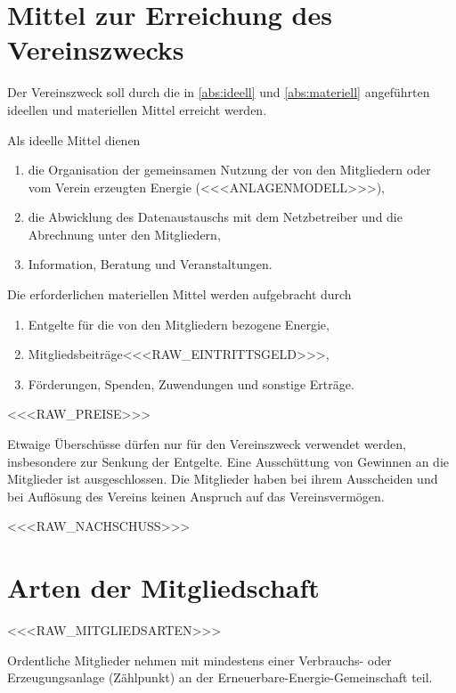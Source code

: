 \documentclass[a4paper,11pt]{article}
\begin{document}
\section{Mittel zur Erreichung des Vereinszwecks}\label{par:mittel}
\begin{absaetze}
  \item Der Vereinszweck soll durch die in \ref{abs:ideell} und \ref{abs:materiell} angeführten ideellen und
        materiellen Mittel erreicht werden.
  \item Als ideelle Mittel dienen\label{abs:ideell}
        \begin{enumerate}[label=\alph*)]
          \item die Organisation der gemeinsamen Nutzung der von den Mitgliedern oder vom Verein erzeugten Energie
                (<<<ANLAGENMODELL>>>),
          \item die Abwicklung des Datenaustauschs mit dem Netzbetreiber und die Abrechnung unter den Mitgliedern,
          \item Information, Beratung und Veranstaltungen.
        \end{enumerate}
  \item Die erforderlichen materiellen Mittel werden aufgebracht durch\label{abs:materiell}
        \begin{enumerate}[label=\alph*)]
          \item Entgelte für die von den Mitgliedern bezogene Energie,
          \item Mitgliedsbeiträge<<<RAW_EINTRITTSGELD>>>,
          \item Förderungen, Spenden, Zuwendungen und sonstige Erträge.
        \end{enumerate}
  \item <<<RAW_PREISE>>>
  \item Etwaige Überschüsse dürfen nur für den Vereinszweck verwendet werden, insbesondere zur Senkung der Entgelte.
        Eine Ausschüttung von Gewinnen an die Mitglieder ist ausgeschlossen. Die Mitglieder haben bei ihrem Ausscheiden
        und bei Auflösung des Vereins keinen Anspruch auf das Vereinsvermögen.
  \item <<<RAW_NACHSCHUSS>>>
\end{absaetze}

\section{Arten der Mitgliedschaft}\label{par:arten}
\begin{absaetze}
  \item <<<RAW_MITGLIEDSARTEN>>>
  \item Ordentliche Mitglieder nehmen mit mindestens einer Verbrauchs- oder Erzeugungsanlage (Zählpunkt) an der
        Erneuerbare-Energie-Gemeinschaft teil.
\end{absaetze}
\end{document}
